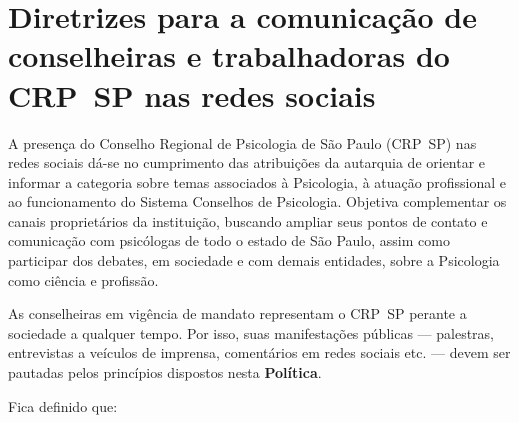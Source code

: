 \chapter{Diretrizes para a comunicação de conselheiras e trabalhadoras do CRP~SP nas redes sociais}

A presença do Conselho Regional de Psicologia de São Paulo (CRP~SP) nas
redes sociais dá-se no cumprimento das atribuições da autarquia de
orientar e informar a categoria sobre temas associados à Psicologia, à
atuação profissional e ao funcionamento do Sistema Conselhos de
Psicologia. Objetiva complementar os canais proprietários da
instituição, buscando ampliar seus pontos de contato e comunicação com
psicólogas de todo o estado de São Paulo, assim como participar dos
debates, em sociedade e com demais entidades, sobre a Psicologia como
ciência e profissão.

As conselheiras em vigência de mandato representam o CRP~SP perante a
sociedade a qualquer tempo. Por isso, suas manifestações públicas ---
palestras, entrevistas a veículos de imprensa, comentários em redes
sociais etc. --- devem ser pautadas pelos princípios dispostos nesta
\textbf{Política}.

Fica definido que:

